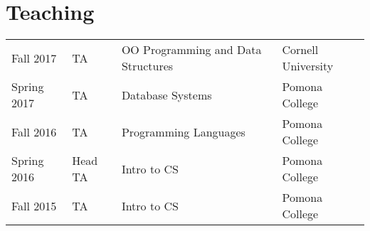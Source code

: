 \documentclass[]{deedy-resume-openfont}
\begin{document}
\begin{minipage}[t]{0.66\textwidth}

\section{Teaching} 

\begin{tabular}{llll}
  
    Fall 2017 & TA & OO Programming and Data Structures & Cornell University \\
  
    Spring 2017 & TA & Database Systems & Pomona College \\
  
    Fall 2016 & TA & Programming Languages & Pomona College \\
  
    Spring 2016 & Head TA & Intro to CS & Pomona College \\
  
    Fall 2015 & TA & Intro to CS & Pomona College \\
  
\end{tabular}


\sectionsep

\end{minipage} 
\end{document}
